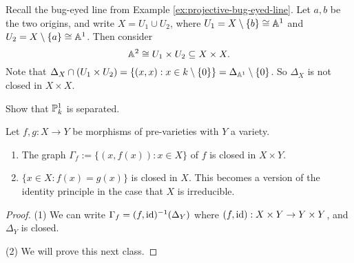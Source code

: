 \begin{example}
  Recall the bug-eyed line from
  Example \ref{ex:projective-bug-eyed-line}.
  Let $a, b$ be the two origins, and
  write
  $X = U_1 \cup U_2$, where
  $U_1 = X \setminus \{b\} \cong \mathbb{A}^1$
  and $U_2 = X \setminus \{a\} \cong \mathbb{A}^1$.
  Then consider
  \[
    \mathbb{A}^2 \cong U_1 \times U_2 \subseteq X \times X.
  \]
  Note that $\Delta_X \cap (U_1 \times U_2) = \{(x, x) : x \in k \setminus \{0\}\} = \Delta_{\mathbb{A}^1} \setminus \{0\}$.
  So $\Delta_X$ is not closed in $X \times X$.
\end{example}

\begin{exercise}
  Show that $\mathbb{P}_k^1$ is separated.
\end{exercise}

\begin{prop}
  Let $f, g : X \to Y$ be morphisms
  of pre-varieties with $Y$ a variety.
  \begin{enumerate}
    \item The graph $\Gamma_f := \{(x, f(x)) : x \in X\}$
      of $f$
      is closed in $X \times Y$.
    \item $\{x \in X : f(x) = g(x)\}$
      is closed in $X$. This becomes a
      version of the identity principle
      in the case that $X$ is irreducible.
  \end{enumerate}
\end{prop}

\begin{proof}
  (1) We can write
  $\Gamma_f = (f, \operatorname{id})^{-1}(\Delta_Y)$
  where $(f, \operatorname{id}) : X \times Y \to Y \times Y$,
  and $\Delta_Y$ is closed.

  (2) We will prove this next class.
\end{proof}

